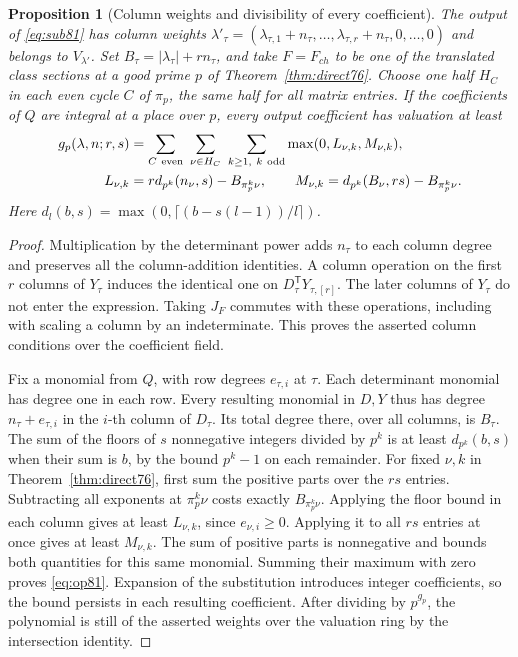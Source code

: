 \documentclass[a4paper,11pt]{article}
\newtheorem{proposition}{Proposition}[section]
\theoremstyle{definition}
\theoremstyle{remark}
\numberwithin{equation}{section}
\begin{document}
\begin{proposition}[Column weights and divisibility of every coefficient]
\label{prop:op81}
The output of \eqref{eq:sub81} has column weights
\(\lambda'_\tau=(\lambda_{\tau,1}+n_\tau,\ldots,
\lambda_{\tau,r}+n_\tau,0,\ldots,0)\) and belongs to \(V_{\lambda'}\).
Set \(B_\tau=|\lambda_\tau|+rn_\tau\), and take \(F=F_{ch}\) to
be one of the translated class sections at a good prime \(p\) of
Theorem~\ref{thm:direct76}. Choose one half \(H_C\) in each even
cycle \(C\) of \(\pi_p\), the same half for all matrix entries.
If the coefficients of \(Q\) are integral at a place over \(p\),
every output coefficient has valuation at least
\begin{align}
 g_p(\lambda,n;r,s)&=\sum_{C\ {\rm even}}\ \sum_{\nu\in H_C}\
               \sum_{k\ge1,\ k\ {\rm odd}}\max(0,L_{\nu,k},M_{\nu,k}),
                                                        \label{eq:op81}\\
 L_{\nu,k}&=r d_{p^k}(n_\nu,s)-B_{\pi_p^k\nu},\qquad
 M_{\nu,k}=d_{p^k}(B_\nu,rs)-B_{\pi_p^k\nu}.             \notag
\end{align}
Here \(d_l(b,s)=\max(0,\lceil(b-s(l-1))/l\rceil)\).
\end{proposition}
\begin{proof}
Multiplication by the determinant power adds \(n_\tau\) to
each column degree and preserves all the column-addition
identities. A column operation on the first \(r\) columns of \(Y_\tau\)
induces the identical one on \(D_\tau^{\mathsf T}Y_{\tau,[r]}\).
The later columns of \(Y_\tau\) do not enter the expression.
Taking \(J_F\) commutes with these operations, including with
scaling a column by an indeterminate. This proves the asserted
column conditions over the coefficient field.

Fix a monomial from \(Q\), with row degrees \(e_{\tau,i}\) at
\(\tau\). Each determinant monomial has degree one in each row.
Every resulting monomial in \(D,Y\) thus has degree
\(n_\tau+e_{\tau,i}\) in the \(i\)-th column of \(D_\tau\).
Its total degree there, over all columns, is \(B_\tau\).
The sum of the floors of \(s\) nonnegative integers divided by
\(p^k\) is at least \(d_{p^k}(b,s)\) when their sum is \(b\), by
the bound \(p^k-1\) on each remainder. For fixed \(\nu,k\) in
Theorem~\ref{thm:direct76}, first sum the positive parts over the
\(rs\) entries. Subtracting all exponents at \(\pi_p^k\nu\) costs
exactly \(B_{\pi_p^k\nu}\). Applying the floor bound in each column
gives at least \(L_{\nu,k}\), since \(e_{\nu,i}\ge0\). Applying it
to all \(rs\) entries at once gives at least \(M_{\nu,k}\).
The sum of positive parts is nonnegative and bounds both quantities
for this same monomial. Summing their maximum with zero proves
\eqref{eq:op81}. Expansion of the substitution introduces integer
coefficients, so the bound persists in each resulting coefficient.
After dividing by \(p^{g_p}\), the polynomial is still of the
asserted weights over the valuation ring by the intersection identity.
\end{proof}
\end{document}

